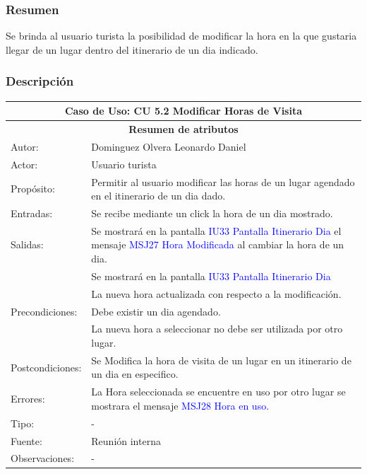 \subsubsection{Resumen}
Se brinda al usuario turista la posibilidad de modificar la hora en la que gustaria llegar de un lugar dentro del itinerario de un dia indicado.

\subsubsection{Descripción}
\begin{tabularx}{\textwidth}{||l|X||}
	\hline
	\multicolumn{2}{||c||}{\textbf{Caso de Uso: CU 5.2 Modificar Horas de Visita}} \\
	\hline
	\multicolumn{2}{||c||}{\textbf{Resumen de atributos}} \\
	\hline
	{Autor:} & Dominguez Olvera Leonardo Daniel \\
    \hline
	{Actor:} & Usuario turista\\
	\hline
	{Propósito:} & Permitir al usuario modificar las horas de un lugar agendado en el itinerario de un dia dado.\\
	\hline
	{Entradas:}& Se recibe mediante un click la hora de un dia mostrado.\\ 
	\hline
	{Salidas:} & Se mostrará en la pantalla \textcolor{blue}{IU33 Pantalla Itinerario Dia} el mensaje \textcolor{blue}{MSJ27 Hora Modificada} al cambiar la hora de un dia.  \\
  & Se mostrará en la pantalla \textcolor{blue}{IU33 Pantalla Itinerario Dia}\\
  & La nueva hora actualizada con respecto a la modificación.\\
	\hline
	{Precondiciones:} & Debe existir un dia agendado.\\
 & La nueva hora a seleccionar no debe ser utilizada por otro lugar.\\
	\hline
	{Postcondiciones:}  & Se Modifica la hora de visita de un lugar en un itinerario de un dia en especifico.\\
	\hline
	{Errores:} & La Hora seleccionada se encuentre en uso por otro lugar se mostrara el mensaje \textcolor{blue}{MSJ28 Hora en uso.} \\
	\hline
	{Tipo:} & -\\
	\hline
	{Fuente:} & Reunión interna \\
	\hline
	{Observaciones:} & {-} \\
	\hline
\end{tabularx}

